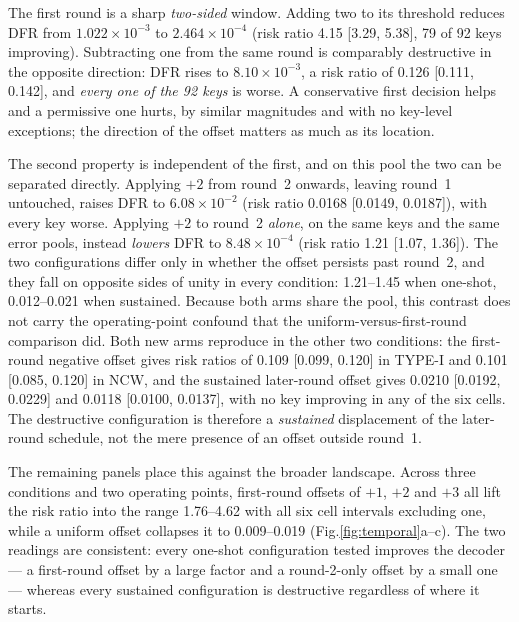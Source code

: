 \documentclass[lettersize,journal]{IEEEtran}
\begin{document}
The first round is a sharp \emph{two-sided} window. Adding two to its threshold reduces DFR from $1.022\times10^{-3}$ to $2.464\times10^{-4}$ (risk ratio 4.15 [3.29, 5.38], 79 of 92 keys improving). Subtracting one from the same round is comparably destructive in the opposite direction: DFR rises to $8.10\times10^{-3}$, a risk ratio of 0.126 [0.111, 0.142], and \emph{every one of the 92 keys} is worse. A conservative first decision helps and a permissive one hurts, by similar magnitudes and with no key-level exceptions; the direction of the offset matters as much as its location.

The second property is independent of the first, and on this pool the two can be separated directly. Applying $+2$ from round~2 onwards, leaving round~1 untouched, raises DFR to $6.08\times10^{-2}$ (risk ratio 0.0168 [0.0149, 0.0187]), with every key worse. Applying $+2$ to round~2 \emph{alone}, on the same keys and the same error pools, instead \emph{lowers} DFR to $8.48\times10^{-4}$ (risk ratio 1.21 [1.07, 1.36]). The two configurations differ only in whether the offset persists past round~2, and they fall on opposite sides of unity in every condition: 1.21--1.45 when one-shot, 0.012--0.021 when sustained. Because both arms share the pool, this contrast does not carry the operating-point confound that the uniform-versus-first-round comparison did. Both new arms reproduce in the other two conditions: the first-round negative offset gives risk ratios of 0.109 [0.099, 0.120] in TYPE-I and 0.101 [0.085, 0.120] in NCW, and the sustained later-round offset gives 0.0210 [0.0192, 0.0229] and 0.0118 [0.0100, 0.0137], with no key improving in any of the six cells. The destructive configuration is therefore a \emph{sustained} displacement of the later-round schedule, not the mere presence of an offset outside round~1.

The remaining panels place this against the broader landscape. Across three conditions and two operating points, first-round offsets of $+1$, $+2$ and $+3$ all lift the risk ratio into the range 1.76--4.62 with all six cell intervals excluding one, while a uniform offset collapses it to 0.009--0.019 (Fig.\ref{fig:temporal}a--c). The two readings are consistent: every one-shot configuration tested improves the decoder --- a first-round offset by a large factor and a round-2-only offset by a small one --- whereas every sustained configuration is destructive regardless of where it starts.
\end{document}
